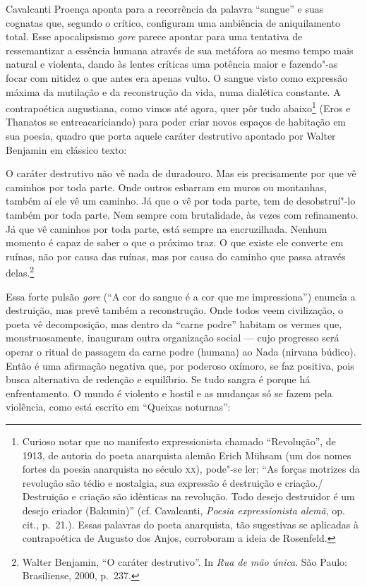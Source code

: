 Cavalcanti Proença aponta para a recorrência da palavra “sangue” e
suas cognatas que, segundo o crítico, configuram uma ambiência de
aniquilamento total. Esse apocalipsismo \textit{gore} parece apontar
para uma tentativa de ressemantizar a essência humana através de sua
metáfora ao mesmo tempo mais natural e violenta, dando às lentes
críticas uma potência maior e fazendo"-as focar com nitidez o que antes
era apenas vulto. O sangue visto como expressão máxima da mutilação e
da reconstrução da vida, numa dialética constante. A contrapoética
augustiana, como vimos até agora, quer pôr tudo abaixo\footnote{
Curioso notar que no manifesto expressionista chamado “Revolução”, de
1913, de autoria do poeta anarquista alemão Erich Mühsam (um dos nomes
fortes da poesia anarquista no século \textsc{xx}), pode"-se ler: “As forças
motrizes da revolução são tédio e nostalgia, sua expressão é destruição
e criação./ Destruição e criação são idênticas na revolução. Todo
desejo destruidor é um desejo criador (Bakunin)” (cf. Cavalcanti, \textit{Poesia
expressionista alemã}, op. cit., p.~21.). Essas palavras do poeta anarquista, tão sugestivas se aplicadas à
contrapoética de Augusto dos Anjos, corroboram a ideia de Rosenfeld.}
(Eros e Thanatos se entreacariciando) para poder criar novos espaços de
habitação em sua poesia, quadro que porta aquele caráter destrutivo
apontado por Walter Benjamin em clássico texto: 

\begin{hedraquote}
O caráter destrutivo não vê nada de duradouro. Mas eis precisamente por
que vê caminhos por toda parte. Onde outros esbarram em muros ou
montanhas, também aí ele vê um caminho. Já que o vê por toda parte, tem
de desobstruí"-lo também por toda parte. Nem sempre com brutalidade, às
vezes com refinamento. Já que vê caminhos por toda parte, está sempre
na encruzilhada. Nenhum momento é capaz de saber o que o próximo traz.
O que existe ele converte em ruínas, não por causa das ruínas, mas por
causa do caminho que passa através delas.\footnote{Walter Benjamin, “O caráter destrutivo”. 
In \textit{Rua de mão única}. São Paulo: Brasiliense, 2000, p.~237.}
\end{hedraquote}

Essa forte pulsão \textit{gore} (“A cor do sangue é a cor que me
impressiona”) enuncia a destruição, mas prevê também a reconstrução.
Onde todos veem civilização, o poeta vê decomposição, mas dentro da
“carne podre” habitam os vermes que, monstruosamente, inauguram outra
organização social --- cujo progresso será operar o ritual de passagem da
carne podre (humana) ao Nada (nirvana búdico). Então é uma afirmação
negativa que, por poderoso oxímoro, se faz positiva, pois busca
alternativa de redenção e equilíbrio. Se tudo sangra é porque há
enfrentamento. O mundo é violento e hostil e as mudanças só se fazem
pela violência, como está escrito em “Queixas noturnas”:

